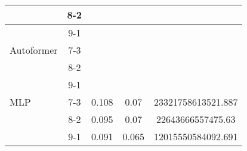 \begin{table}[h!]
\begin{tabular}{|l|c|c|c|c|}
    \rowcolor{green!30}  & 8-2 &  &  &  \\ \hline
    \rowcolor{green!30}  & 9-1 &  &  &  \\ \hline
    \rowcolor{white} Autoformer & 7-3 &  &  &  \\ \hline
    \rowcolor{white}  & 8-2 &  &  &  \\ \hline
    \rowcolor{white}  & 9-1 &  &  &  \\ \hline
    \rowcolor{white} MLP & 7-3 & 0.108 & 0.07 & 23321758613521.887 \\ \hline
    \rowcolor{white}  & 8-2 & 0.095 & 0.07 & 22643666557475.63 \\ \hline
    \rowcolor{white}  & 9-1 & 0.091 & 0.065 & 12015550584092.691 \\ \hline
    \end{tabular}
    \end{table}